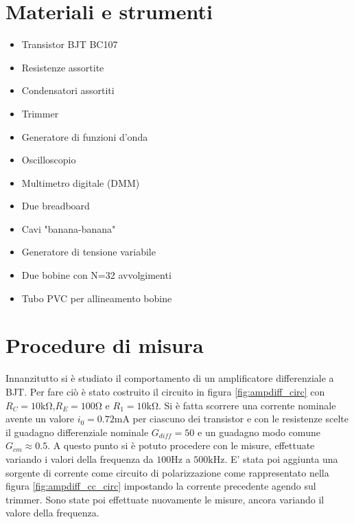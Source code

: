 \documentclass{article}
\begin{document}
\section{Materiali e strumenti}
\begin{itemize}
    \item Transistor BJT BC107
    \item Resistenze assortite
    \item Condensatori assortiti
    \item Trimmer
    \item Generatore di funzioni d'onda
    \item Oscilloscopio
    \item Multimetro digitale (DMM)
    \item Due breadboard
    \item Cavi "banana-banana"
    \item Generatore di tensione variabile
    \item Due bobine con N=32 avvolgimenti
    \item Tubo PVC per allineamento bobine
\end{itemize}

\newpage

\section{Procedure di misura}
Innanzitutto si è studiato il comportamento di un amplificatore differenziale a BJT. Per fare ciò è stato costruito il circuito in figura \ref{fig:ampdiff_circ} con $R_C=10\si{\kilo\ohm}$,$R_E=100\si{\ohm}$ e $R_1=10\si{\kilo\ohm}$. Si è fatta scorrere una corrente nominale avente un valore $i_0=0.72\si{\milli\ampere}$ per ciascuno dei transistor e con le resistenze scelte il guadagno differenziale nominale $G_{diff}=50$ e un guadagno modo comune $G_{cm} \approx 0.5$. A questo punto si è potuto procedere con le misure, effettuate variando i valori della frequenza da $100\si{\hertz}$ a $500\si{\kilo\hertz}$. E' stata poi aggiunta una sorgente di corrente come circuito di polarizzazione come rappresentato nella figura \ref{fig:ampdiff_cc_circ} impostando la corrente precedente agendo sul trimmer. Sono state poi effettuate nuovamente le misure, ancora variando il valore della frequenza. \\
\end{document}
